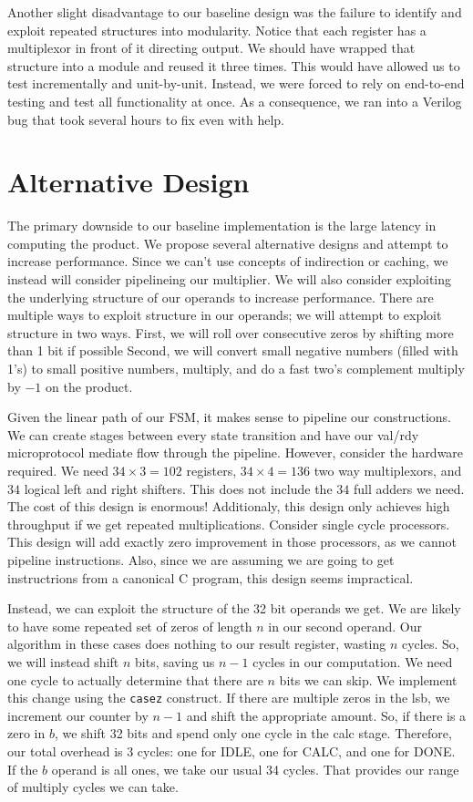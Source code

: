 \documentclass[11pt]{article}
\begin{document}
Another slight disadvantage to our baseline design was the failure to identify and exploit repeated structures into modularity.
Notice that each register has a multiplexor in front of it directing output.
We should have wrapped that structure into a module and reused it three times. 
This would have allowed us to test incrementally and unit-by-unit.
Instead, we were forced to rely on end-to-end testing and test all functionality at once.
As a consequence, we ran into a Verilog bug that took several hours to fix even with help.  
 

\section{Alternative Design}

The primary downside to our baseline implementation is the large latency in computing the product.
We propose several alternative designs and attempt to increase performance.
Since we can't use concepts of indirection or caching, we instead will consider pipelineing our multiplier.
We will also consider exploiting the underlying structure of our operands to increase performance.
There are multiple ways to exploit structure in our operands; we will attempt to exploit structure in two ways.
First, we will roll over consecutive zeros by shifting more than 1 bit if possible
Second, we will convert small negative numbers (filled with 1's) to small positive numbers, multiply,
and do a fast two's complement multiply by $-1$ on the product.

Given the linear path of our FSM, it makes sense to pipeline our constructions.
We can create stages between every state transition and have our val/rdy microprotocol mediate flow through the pipeline.
However, consider the hardware required. We need $34 \times 3 = 102$ registers, $34 \times 4 = 136$ two way multiplexors,
and $34$ logical left and right shifters.
This does not include the $34$ full adders we need. 
The cost of this design is enormous!
Additionaly, this design only achieves high throughput if we get repeated multiplications.
Consider single cycle processors.
This design will add exactly zero improvement in those processors, as we cannot pipeline instructions. 
Also, since we are assuming we are going to get instructrions from a canonical C program, this design seems impractical.

Instead, we can exploit the structure of the 32 bit operands we get.
We are likely to have some repeated set of zeros of length $n$ in our second operand.
Our algorithm in these cases does nothing to our result register, wasting $n$ cycles.
So, we will instead shift $n$ bits, saving us $n-1$ cycles in our computation.
We need one cycle to actually determine that there are $n$ bits we can skip.
We implement this change using the \verb+casez+ construct.
If there are multiple zeros in the lsb, we increment our counter by $n-1$ and shift the appropriate amount.
So, if there is a zero in $b$, we shift 32 bits and spend only one cycle in the calc stage.
Therefore, our total overhead is 3 cycles: one for IDLE, one for CALC, and one for DONE.
If the $b$ operand is all ones, we take our usual 34 cycles.
That provides our range of multiply cycles we can take.
\end{document}

